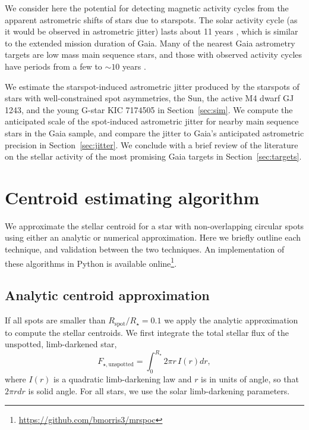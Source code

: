 We consider here the potential for detecting magnetic activity cycles from the apparent astrometric shifts of stars due to starspots. The solar activity cycle (as it would be observed in astrometric jitter) lasts about 11 years \citep[see review by][]{Hathaway2015}, which is similar to the extended mission duration of Gaia. Many of the nearest Gaia astrometry targets are low mass main sequence stars, and those with observed activity cycles have periods from a few to $\sim 10$ years \citep{GomesdaSilva2012, Robertson2013, Mascareno2016}. 

We estimate the starspot-induced astrometric jitter produced by the starspots of stars with well-constrained spot asymmetries, the Sun, the active M4 dwarf GJ 1243, and the young G-star KIC 7174505 in Section~\ref{sec:sim}. We compute the anticipated scale of the spot-induced astrometric jitter for nearby main sequence stars in the Gaia sample, and compare the jitter to Gaia's anticipated astrometric precision in Section~\ref{sec:jitter}. We conclude with a brief review of the literature on the stellar activity of the most promising Gaia targets in Section~\ref{sec:targets}.

\section{Centroid estimating algorithm}

We approximate the stellar centroid for a star with non-overlapping circular spots using either an analytic or numerical approximation. Here we briefly outline each technique, and validation between the two techniques. An implementation of these algorithms in Python is available online\footnote{\url{https://github.com/bmorris3/mrspoc}}. 

\subsection{Analytic centroid approximation}
If all spots are smaller than $R_{\mathrm{spot}}/R_\star = 0.1$ we apply the analytic approximation to compute the stellar centroids. We first integrate the total stellar flux of the unspotted, limb-darkened star,
\begin{equation}
F_{\star, \mathrm{unspotted}} = \int_{0}^{R_\star} 2 \pi r \, I(r) dr,
\end{equation}
where $I(r)$ is a quadratic limb-darkening law and $r$ is in units of
angle, so that $2\pi rdr$ is solid angle. For all stars, we use the solar limb-darkening parameters.

